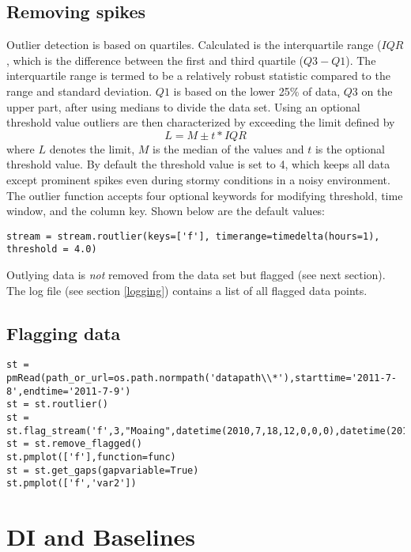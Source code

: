\subsection{Removing spikes}

Outlier detection is based on quartiles. Calculated is the interquartile range ($IQR$, which is the difference between the first and third quartile ($Q3 - Q1$). The interquartile range is termed to be a relatively robust statistic compared to the range and standard deviation. $Q1$ is based on the lower 25\% of data, $Q3$ on the upper part, after using medians to divide the data set. Using an optional threshold value outliers are then characterized by exceeding the limit defined by
\begin{equation}\label{outlier}
    L = M \pm t*IQR
\end{equation}
where $L$ denotes the limit, $M$ is the median of the values and $t$ is the optional threshold value. By default the threshold value is set to 4, which keeps all data except prominent spikes even during stormy conditions in a noisy environment. The outlier function accepts four optional keywords for modifying threshold, time window, and the column key. Shown below are the default values:
\begin{verbatim}
stream = stream.routlier(keys=['f'], timerange=timedelta(hours=1), threshold = 4.0)
\end{verbatim}
Outlying data is \emph{not} removed from the data set but flagged (see next section). The log file (see section \ref{logging}) contains a list of all flagged data points.

\subsection{Flagging data}\label{flagging}

\begin{verbatim}
st = pmRead(path_or_url=os.path.normpath('datapath\\*'),starttime='2011-7-8',endtime='2011-7-9')
st = st.routlier()
st = st.flag_stream('f',3,"Moaing",datetime(2010,7,18,12,0,0,0),datetime(2010,7,18,13,0,0,0))
st = st.remove_flagged()
st.pmplot(['f'],function=func)
st = st.get_gaps(gapvariable=True)
st.pmplot(['f','var2'])
\end{verbatim}


\section{DI and Baselines}

